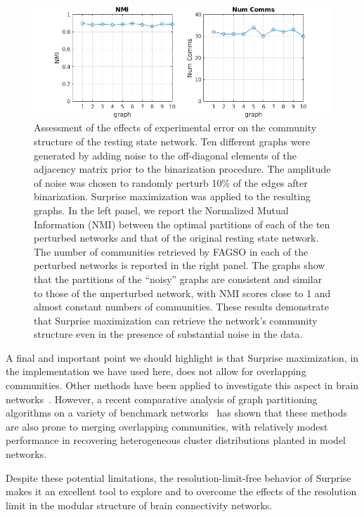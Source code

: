 \begin{figure}[ht]
\centering
\includegraphics[width=1\linewidth]{images/figure_9_nmi.png}
\caption{Assessment of the effects of experimental error on the community structure of the resting state network. Ten different graphs were generated by adding noise to the off-diagonal elements of the adjacency matrix prior to the binarization procedure. The amplitude of noise was chosen to randomly perturb 10\% of the edges after binarization. Surprise maximization was applied to the resulting graphs. In the left panel, we report the Normalized Mutual Information (NMI) between the optimal partitions of each of the ten perturbed networks and that of the original resting state network. The number of communities retrieved by FAGSO in each of the perturbed networks is reported in the right panel. The graphs show that the partitions of the “noisy” graphs are consistent and similar to those of the unperturbed network, with NMI scores close to 1 and almost constant numbers of communities. These results demonstrate that Surprise maximization can retrieve the network's community structure even in the presence of substantial noise in the data.
}
\label{fig:figure_9_nmi}
\end{figure}

A final and important point we should highlight is that Surprise maximization, in the implementation we have used here, does not allow for overlapping communities. Other methods have been applied to investigate this aspect in brain networks~\cite{palla2005,ahn2010}. However, a recent comparative analysis of graph partitioning algorithms on a variety of benchmark networks~\cite{lancichinetti2009} has shown that these methods are also prone to merging overlapping communities, with relatively modest performance in recovering heterogeneous cluster distributions planted in model networks.

Despite these potential limitations, the resolution-limit-free behavior of Surprise makes it an excellent tool to explore and to overcome the effects of the resolution limit in the modular structure of brain connectivity networks.

